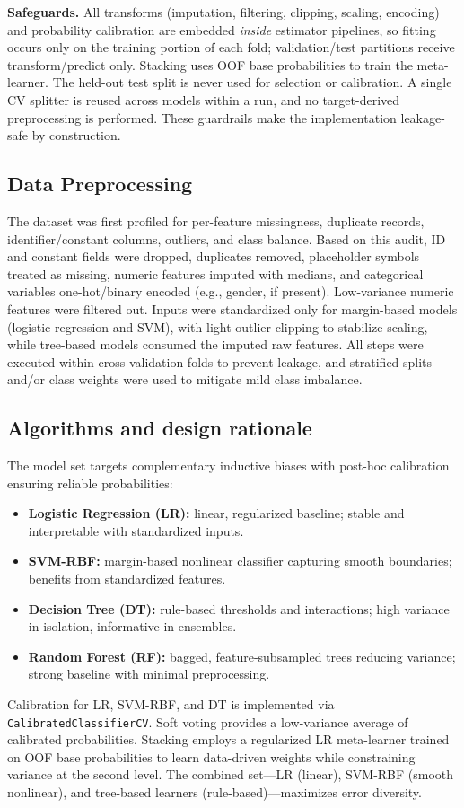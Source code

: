 \documentclass[conference]{IEEEtran}
\begin{document}
\textbf{Safeguards.} All transforms (imputation, filtering, clipping, scaling, encoding) and probability calibration are embedded \emph{inside} estimator pipelines, so fitting occurs only on the training portion of each fold; validation/test partitions receive transform/predict only. Stacking uses OOF base probabilities to train the meta-learner. The held-out test split is never used for selection or calibration. A single CV splitter is reused across models within a run, and no target-derived preprocessing is performed. These guardrails make the implementation leakage-safe by construction.

\subsection{Data Preprocessing}
The dataset was first profiled for per-feature missingness, duplicate records, identifier/constant columns, outliers, and class balance. Based on this audit, ID and constant fields were dropped, duplicates removed, placeholder symbols treated as missing, numeric features imputed with medians, and categorical variables one-hot/binary encoded (e.g., gender, if present). Low-variance numeric features were filtered out. Inputs were standardized only for margin-based models (logistic regression and SVM), with light outlier clipping to stabilize scaling, while tree-based models consumed the imputed raw features. All steps were executed within cross-validation folds to prevent leakage, and stratified splits and/or class weights were used to mitigate mild class imbalance.

\subsection{Algorithms and design rationale}
The model set targets complementary inductive biases with post-hoc calibration ensuring reliable probabilities:
\begin{itemize}
  \item \textbf{Logistic Regression (LR):} linear, regularized baseline; stable and interpretable with standardized inputs.
  \item \textbf{SVM-RBF:} margin-based nonlinear classifier capturing smooth boundaries; benefits from standardized features.
  \item \textbf{Decision Tree (DT):} rule-based thresholds and interactions; high variance in isolation, informative in ensembles.
  \item \textbf{Random Forest (RF):} bagged, feature-subsampled trees reducing variance; strong baseline with minimal preprocessing.
\end{itemize}
Calibration for LR, SVM-RBF, and DT is implemented via \texttt{CalibratedClassifierCV}. Soft voting provides a low-variance average of calibrated probabilities. Stacking employs a regularized LR meta-learner trained on OOF base probabilities to learn data-driven weights while constraining variance at the second level. The combined set---LR (linear), SVM-RBF (smooth nonlinear), and tree-based learners (rule-based)---maximizes error diversity.
\end{document}

